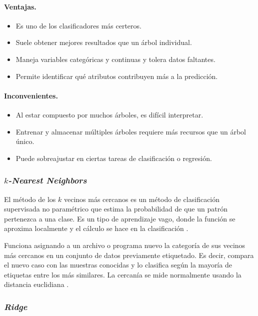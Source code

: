 \newpage
\paragraph*{\textbf{Ventajas.}}
\begin{itemize}
	\item Es uno de los clasificadores más certeros.
	\item Suele obtener mejores resultados que un árbol individual.
	\item Maneja variables categóricas y continuas y tolera datos faltantes.
	\item Permite identificar qué atributos contribuyen más a la predicción.
\end{itemize}

\paragraph*{\textbf{Inconvenientes.}}
\begin{itemize}
	\item Al estar compuesto por muchos árboles, es difícil interpretar.
	\item Entrenar y almacenar múltiples árboles requiere más recursos que un árbol único.
	\item Puede sobreajustar en ciertas tareas de clasificación o regresión.
\end{itemize}

\subsubsection{\textit{$k$-Nearest Neighbors}}
\label{subsubsec:kneighbors}

El método de los $k$ vecinos más cercanos es un método de clasificación supervisada no paramétrico que estima la probabilidad de que un patrón pertenezca a una clase. Es un tipo de aprendizaje vago, donde la función se aproxima localmente y el cálculo se hace en la clasificación \cite{knn_wiki}.

\vspace{1em}

Funciona asignando a un archivo o programa nuevo la categoría de sus vecinos más cercanos en un conjunto de datos previamente etiquetado. Es decir, compara el nuevo caso con las muestras conocidas y lo clasifica según la mayoría de etiquetas entre los más similares. La cercanía se mide normalmente usando la distancia euclidiana \cite{knn_sklearn}.

\subsubsection{\textit{Ridge}}
\label{subsubsec:ridge}

